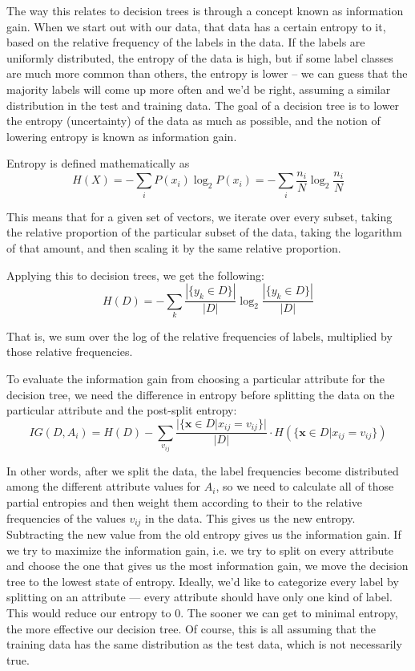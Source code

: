 \documentclass[12pt, letterpaper]{article}
\begin{document}
The way this relates to decision trees is through a concept known as information gain. When we start out with our data, that data has a certain entropy to it, based on the relative frequency of the labels in the data. If the labels are uniformly distributed, the entropy of the data is high, but if some label classes are much more common than others, the entropy is lower -- we can guess that the majority labels will come up more often and we'd be right, assuming a similar distribution in the test and training data. The goal of a decision tree is to lower the entropy (uncertainty) of the data as much as possible, and the notion of lowering entropy is known as information gain. 

Entropy is defined mathematically as 
\begin{equation}
    H(X) = - \sum_i P(x_i)\log_2 P(x_i) = - \sum_i \frac{n_i}{N} \log_2 \frac{n_i}{N}
\end{equation}

This means that for a given set of vectors, we iterate over every subset, taking the relative proportion of the particular subset of the data, taking the logarithm of that amount, and then scaling it by the same relative proportion. 

Applying this to decision trees, we get the following:
\begin{equation}
    H(D) = - \sum_k \frac{|\{y_k \in D\}|}{|D|} \log_2 \frac{|\{y_k \in D\}|}{|D|}
\end{equation}

That is, we sum over the log of the relative frequencies of labels, multiplied by those relative frequencies.

To evaluate the information gain from choosing a particular attribute for the decision tree, we need the difference in entropy before splitting the data on the particular attribute and the post-split entropy:
\begin{equation}
    IG(D,A_i) = H(D) - \sum_{v_{ij}} \frac{|\{\boldsymbol{x}\in D|x_{ij} = v_{ij}\}|}{|D|} \cdot H(\{\boldsymbol{x}\in D|x_{ij} = v_{ij}\})
\end{equation}

In other words, after we split the data, the label frequencies become distributed among the different attribute values for $A_i$, so we need to calculate all of those partial entropies and then weight them according to their to the relative frequencies of the values $v_{ij}$ in the data. This gives us the new entropy. Subtracting the new value from the old entropy gives us the information gain. If we try to maximize the information gain, i.e. we try to split on every attribute and choose the one that gives us the most information gain, we move the decision tree to the lowest state of entropy. Ideally, we'd like to categorize every label by splitting on an attribute --- every attribute should have only one kind of label. This would reduce our entropy to 0. The sooner we can get to minimal entropy, the more effective our decision tree. Of course, this is all assuming that the training data has the same distribution as the test data, which is not necessarily true.
\end{document}

